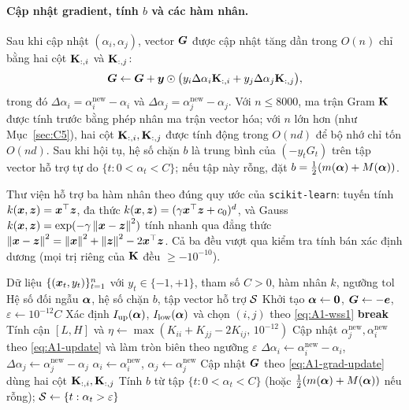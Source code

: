 \paragraph{Cập nhật gradient, tính $b$ và các hàm nhân.}
Sau khi cập nhật $(\alpha_i, \alpha_j)$, vector $\bm{G}$ được cập nhật tăng dần trong $O(n)$ chỉ bằng hai cột $\mathbf{K}_{:, i}$ và $\mathbf{K}_{:, j}$:
\begin{equation}\label{eq:A1-grad-update}
  \bm{G} \leftarrow \bm{G} + \bm{y} \odot \bigl(y_i \Delta\alpha_i \mathbf{K}_{:, i} + y_j \Delta\alpha_j \mathbf{K}_{:, j}\bigr),
\end{equation}
trong đó $\Delta\alpha_i = \alpha_i^{\text{new}} - \alpha_i$ và $\Delta\alpha_j = \alpha_j^{\text{new}} - \alpha_j$. Với $n \le 8000$, ma trận Gram $\mathbf{K}$ được tính trước bằng phép nhân ma trận vector hóa; với $n$ lớn hơn (như Mục~\ref{sec:C5}), hai cột $\mathbf{K}_{:, i}, \mathbf{K}_{:, j}$ được tính động trong $O(nd)$ để bộ nhớ chỉ tốn $O(nd)$. Sau khi hội tụ, hệ số chặn $b$ là trung bình của $(-y_t G_t)$ trên tập vector hỗ trợ tự do $\{t : 0 < \alpha_t < C\}$; nếu tập này rỗng, đặt $b = \frac{1}{2}(m(\bm{\alpha}) + M(\bm{\alpha}))$.

Thư viện hỗ trợ ba hàm nhân theo đúng quy ước của \texttt{scikit-learn}: tuyến tính $k(\bm{x},\bm{z}) = \bm{x}^{\top}\bm{z}$, đa thức $k(\bm{x},\bm{z}) = (\gamma\bm{x}^{\top}\bm{z} + c_0)^d$, và Gauss $k(\bm{x},\bm{z}) = \exp(-\gamma\left\lVert \bm{x} - \bm{z} \right\rVert^2)$ tính nhanh qua đẳng thức $\left\lVert \bm{x} - \bm{z} \right\rVert^2 = \left\lVert \bm{x} \right\rVert^2 + \left\lVert \bm{z} \right\rVert^2 - 2\bm{x}^{\top}\bm{z}$. Cả ba đều vượt qua kiểm tra tính bán xác định dương (mọi trị riêng của $\mathbf{K}$ đều $\ge -10^{-10}$).

\begin{algorithm}[!htbp]
\caption{Thuật toán SMO chọn cặp vi phạm KKT lớn nhất (WSS1)}\label{alg:A1-smo}
\begin{algorithmic}[1]
\Require Dữ liệu $\{(\bm{x}_t, y_t)\}_{t=1}^n$ với $y_t \in \{-1, +1\}$, tham số $C > 0$, hàm nhân $k$, ngưỡng $\mathrm{tol}$
\Ensure Hệ số đối ngẫu $\bm{\alpha}$, hệ số chặn $b$, tập vector hỗ trợ $\mathcal{S}$
\State Khởi tạo $\bm{\alpha} \leftarrow \bm{0}$, $\bm{G} \leftarrow -\bm{e}$, $\varepsilon \leftarrow 10^{-12}C$
  \State Xác định $I_{\mathrm{up}}(\bm{\alpha})$, $I_{\mathrm{low}}(\bm{\alpha})$ và chọn $(i, j)$ theo \eqref{eq:A1-wss1}
    \State \textbf{break} 
  \EndIf
  \State Tính cận $[L, H]$ và $\eta \leftarrow \max(K_{ii} + K_{jj} - 2K_{ij},\, 10^{-12})$
  \State Cập nhật $\alpha_j^{\text{new}}, \alpha_i^{\text{new}}$ theo \eqref{eq:A1-update} và làm tròn biên theo ngưỡng $\varepsilon$
  \State $\Delta\alpha_i \leftarrow \alpha_i^{\text{new}} - \alpha_i$, \; $\Delta\alpha_j \leftarrow \alpha_j^{\text{new}} - \alpha_j$
  \State $\alpha_i \leftarrow \alpha_i^{\text{new}}$, \; $\alpha_j \leftarrow \alpha_j^{\text{new}}$
  \State Cập nhật $\bm{G}$ theo \eqref{eq:A1-grad-update} dùng hai cột $\mathbf{K}_{:, i}, \mathbf{K}_{:, j}$
\EndFor
\State Tính $b$ từ tập $\{t : 0 < \alpha_t < C\}$ (hoặc $\frac{1}{2}(m(\bm{\alpha}) + M(\bm{\alpha}))$ nếu rỗng); $\mathcal{S} \leftarrow \{t : \alpha_t > \varepsilon\}$
\end{algorithmic}
\end{algorithm}

